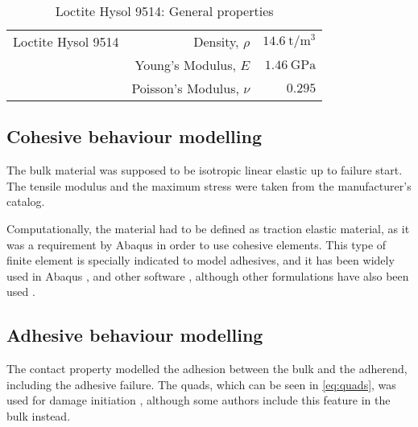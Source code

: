 \begin{table}
\begin{tabular}{lrr}

  \toprule
  Loctite Hysol 9514 	& Density, $\rho$ 			& $\SI{14.6}{\tonne/\m^3}$ 	\\
  						& Young's Modulus, $E$ 		& $\SI{1.46}{\GPa}$ 		\\
  						& Poisson's Modulus, $\nu$ 	& $\num{0.295}$ 			\\
  \bottomrule

\end{tabular}
\caption{Loctite Hysol 9514: General properties}
\label{table:loctite_props}
\end{table}

\subsection{Cohesive behaviour modelling}

The bulk material was supposed to be isotropic linear elastic \citep{SernaMoreno2015} up to failure start. The tensile modulus and the maximum stress were taken from the manufacturer's catalog.

Computationally, the material had to be defined as traction elastic material, as it was a requirement by Abaqus in order to use cohesive elements. This type of finite element is specially indicated to model adhesives, and it has been widely used in Abaqus \citep{Sadowski2010, Sadowski2011, Sadowski2014, Alvarez2014}, and other software \citep{Sato2000, Carlberger2007, Loureiro2010, Scattina2011 Ghasemnejad2013}, although other formulations have also been used \citep{Greve2007, Liao2011, Yang2012, May2014}. %


\subsection{Adhesive behaviour modelling}

The contact property modelled the adhesion between the bulk and the adherend, including the adhesive failure. The \gls{quads}, which can be seen in \ref{eq:quads}, was used for damage initiation \citep{Greve2007, Loureiro2010, Sadowski2010, Sadowski2011, Sadowski2014, SernaMoreno2015}, although some authors include this feature in the bulk instead.

